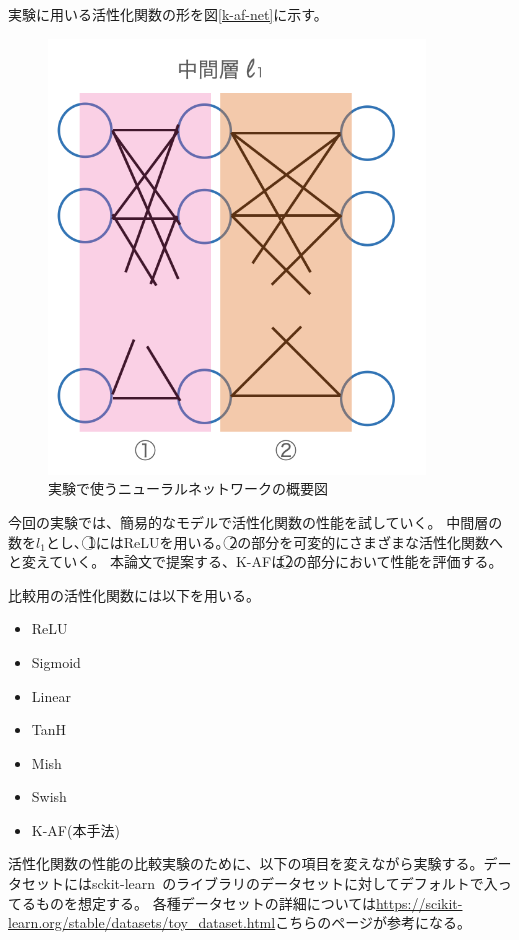 実験に用いる活性化関数の形を図\ref{k-af-net}に示す。
\begin{figure}[hbtp]
\label{k-af-net}
    \begin{center}
        \includegraphics[width=10cm]{asset/k-af-net.png}
            \caption{実験で使うニューラルネットワークの概要図}
            \label{neural_network1}
    \end{center}
\end{figure}

今回の実験では、簡易的なモデルで活性化関数の性能を試していく。
中間層の数を$ l_1 $とし、\textcircled{\scriptsize 1}にはReLUを用いる。\textcircled{\scriptsize 2}の部分を可変的にさまざまな活性化関数へと変えていく。
本論文で提案する、K-AFは\textcircled{\scriptsize 2}の部分において性能を評価する。

比較用の活性化関数には以下を用いる。
\begin{itemize}
\label{list:active}
    \setlength{\parskip}{0cm} %
    \setlength{\itemsep}{0cm} %
    \item ReLU
    \item Sigmoid
    \item Linear
    \item TanH
    \item Mish
    \item Swish
    \item K-AF(本手法)
\end{itemize}


活性化関数の性能の比較実験のために、以下の項目を変えながら実験する。データセットにはsckit-learn~\cite{scikit-learn}のライブラリのデータセットに対してデフォルトで入ってるものを想定する。
各種データセットの詳細については\url{https://scikit-learn.org/stable/datasets/toy_dataset.html}こちらのページが参考になる。

